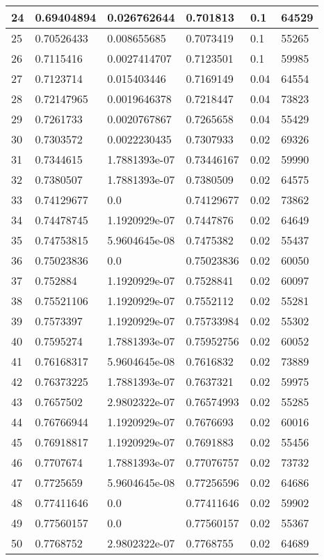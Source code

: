 \begin{longtable}{|l|l|l|l|l|l|}
24 & 0.69404894 & 0.026762644 & 0.701813 & 0.1 & 64529 \\ \hline 
25 & 0.70526433 & 0.008655685 & 0.7073419 & 0.1 & 55265 \\ \hline 
26 & 0.7115416 & 0.0027414707 & 0.7123501 & 0.1 & 59985 \\ \hline 
27 & 0.7123714 & 0.015403446 & 0.7169149 & 0.04 & 64554 \\ \hline 
28 & 0.72147965 & 0.0019646378 & 0.7218447 & 0.04 & 73823 \\ \hline 
29 & 0.7261733 & 0.0020767867 & 0.7265658 & 0.04 & 55429 \\ \hline 
30 & 0.7303572 & 0.0022230435 & 0.7307933 & 0.02 & 69326 \\ \hline 
31 & 0.7344615 & 1.7881393e-07 & 0.73446167 & 0.02 & 59990 \\ \hline 
32 & 0.7380507 & 1.7881393e-07 & 0.7380509 & 0.02 & 64575 \\ \hline 
33 & 0.74129677 & 0.0 & 0.74129677 & 0.02 & 73862 \\ \hline 
34 & 0.74478745 & 1.1920929e-07 & 0.7447876 & 0.02 & 64649 \\ \hline 
35 & 0.74753815 & 5.9604645e-08 & 0.7475382 & 0.02 & 55437 \\ \hline 
36 & 0.75023836 & 0.0 & 0.75023836 & 0.02 & 60050 \\ \hline 
37 & 0.752884 & 1.1920929e-07 & 0.7528841 & 0.02 & 60097 \\ \hline 
38 & 0.75521106 & 1.1920929e-07 & 0.7552112 & 0.02 & 55281 \\ \hline 
39 & 0.7573397 & 1.1920929e-07 & 0.75733984 & 0.02 & 55302 \\ \hline 
40 & 0.7595274 & 1.7881393e-07 & 0.75952756 & 0.02 & 60052 \\ \hline 
41 & 0.76168317 & 5.9604645e-08 & 0.7616832 & 0.02 & 73889 \\ \hline 
42 & 0.76373225 & 1.7881393e-07 & 0.7637321 & 0.02 & 59975 \\ \hline 
43 & 0.7657502 & 2.9802322e-07 & 0.76574993 & 0.02 & 55285 \\ \hline 
44 & 0.76766944 & 1.1920929e-07 & 0.7676693 & 0.02 & 60016 \\ \hline 
45 & 0.76918817 & 1.1920929e-07 & 0.7691883 & 0.02 & 55456 \\ \hline 
46 & 0.7707674 & 1.7881393e-07 & 0.77076757 & 0.02 & 73732 \\ \hline 
47 & 0.7725659 & 5.9604645e-08 & 0.77256596 & 0.02 & 64686 \\ \hline 
48 & 0.77411646 & 0.0 & 0.77411646 & 0.02 & 59902 \\ \hline 
49 & 0.77560157 & 0.0 & 0.77560157 & 0.02 & 55367 \\ \hline 
50 & 0.7768752 & 2.9802322e-07 & 0.7768755 & 0.02 & 64689 \\ \hline 
\end{longtable}